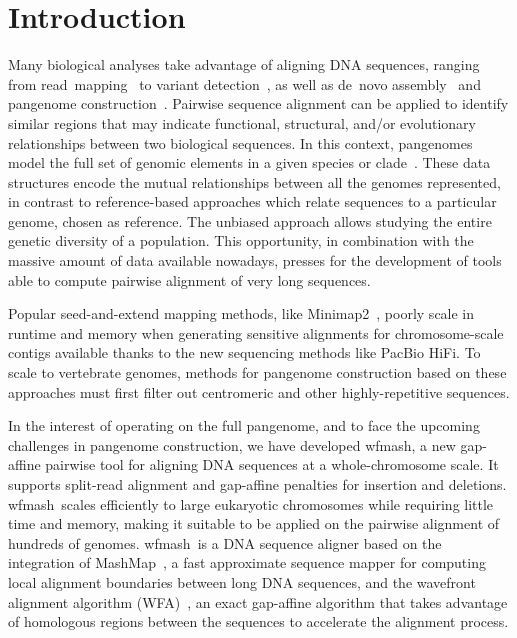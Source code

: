 \documentclass{bioinfo}
\newcommand{\wfmash}{wfmash}
\begin{document}
    \maketitle


    \section{Introduction}

    Many biological analyses take advantage of aligning DNA sequences, ranging from read~mapping~\citep{22388286, BWA_MEM, 23103880}
    to variant detection~\citep{21478889}, as well as de~novo assembly~\citep{19251739} and
    pangenome construction~\citep{33177663, 33066802}. Pairwise sequence alignment can be applied to identify
    similar regions that may indicate functional, structural, and/or evolutionary
    relationships between two biological sequences. In this context, pangenomes model the full set
    of genomic elements in a given species or clade~\citep{32453966}. These data structures encode the mutual
    relationships between all the genomes represented, in contrast to reference-based approaches which
    relate sequences to a particular genome, chosen as reference. The unbiased approach allows studying
    the entire genetic diversity of a population. This opportunity, in combination with the massive amount of data
    available nowadays, presses for the development of tools able to compute pairwise alignment of very long sequences.

    Popular seed-and-extend mapping methods, like Minimap2~\citep{29750242}, poorly scale in runtime and memory
    when generating sensitive alignments for chromosome-scale contigs available thanks to the new sequencing methods
    like PacBio HiFi. To scale to vertebrate genomes, methods for pangenome construction based on these approaches
    must first filter out centromeric and other highly-repetitive sequences.

    In the interest of operating on the full pangenome, and to face the upcoming challenges in pangenome construction,
    we have developed \wfmash\/, a new gap-affine pairwise tool for aligning DNA sequences at a whole-chromosome scale.
    It supports split-read alignment and gap-affine penalties for insertion and deletions. \wfmash\ scales
    efficiently to large eukaryotic chromosomes while requiring little time and memory, making it suitable to
    be applied on the pairwise alignment of hundreds of genomes. \wfmash\ is a DNA sequence aligner based on the
    integration of MashMap~\citep{30423094}, a fast approximate sequence mapper for computing local alignment boundaries
    between long DNA sequences, and the wavefront alignment algorithm (WFA)~\citep{32915952}, an exact gap-affine
    algorithm that takes advantage of homologous regions between the sequences to accelerate the alignment process.
\end{document}
